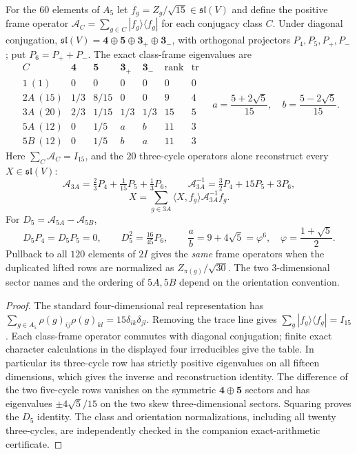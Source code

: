 \documentclass[11pt]{article}
\begin{document}
\begin{theorem}
\label{p1:thm:v342-class-frame-three-cycle-tomography}
For the $60$ elements of $A_5$ let
$f_g=Z_g/\sqrt{15}\in\mathfrak{sl}(V)$ and define the positive
frame operator $\mathcal A_C=\sum_{g\in C}|f_g\rangle\langle f_g|$
for each conjugacy class $C$.  Under diagonal conjugation,
$\mathfrak{sl}(V)=\mathbf4\oplus\mathbf5\oplus\mathbf3_+\oplus
\mathbf3_-$, with orthogonal projectors $P_4,P_5,P_+,P_-$;
put $P_6=P_++P_-$.  The exact class-frame eigenvalues are
\[
\begin{array}{c|cccc|cc}
 C & \mathbf4 & \mathbf5 & \mathbf3_+ & \mathbf3_- &
 \operatorname{rank} & \operatorname{tr}\\ \hline
 1\ (1)&0&0&0&0&0&0\\
 2A\ (15)&1/3&8/15&0&0&9&4\\
 3A\ (20)&2/3&1/15&1/3&1/3&15&5\\
 5A\ (12)&0&1/5&a&b&11&3\\
 5B\ (12)&0&1/5&b&a&11&3
\end{array}
\quad a=\frac{5+2\sqrt5}{15},\quad b=\frac{5-2\sqrt5}{15}.
\]
Here $\sum_C\mathcal A_C=I_{15}$, and the $20$ three-cycle
operators alone reconstruct every $X\in\mathfrak{sl}(V)$:
\[
 \mathcal A_{3A}=\tfrac23P_4+\tfrac1{15}P_5+\tfrac13P_6,
 \qquad \mathcal A_{3A}^{-1}=\tfrac32P_4+15P_5+3P_6,
\]
\[
 \boxed{X=\sum_{g\in3A}\langle X,f_g\rangle
              \mathcal A_{3A}^{-1}f_g.}
\]
For $D_5=\mathcal A_{5A}-\mathcal A_{5B}$,
\[
 D_5P_4=D_5P_5=0,\qquad
 D_5^2=\tfrac{16}{45}P_6,\qquad
 \frac ab=9+4\sqrt5=\varphi^6,
 \quad\varphi=\frac{1+\sqrt5}{2}.
\]
Pullback to all $120$ elements of $2I$ gives the \emph{same}
frame operators when the duplicated lifted rows are normalized
as $Z_{\pi(g)}/\sqrt{30}$.  The two $3$-dimensional sector names
and the ordering of $5A,5B$ depend on the orientation convention.
\end{theorem}
\begin{proof}
The standard four-dimensional real representation has
$\sum_{g\in A_5}\rho(g)_{ij}\rho(g)_{kl}=15\delta_{ik}\delta_{jl}$.
Removing the trace line gives $\sum_g|f_g\rangle\langle f_g|=I_{15}$.
Each class-frame operator commutes with diagonal conjugation;
finite exact character calculations in the displayed four
irreducibles give the table.  In particular its three-cycle row
has strictly positive eigenvalues on all fifteen dimensions,
which gives the inverse and reconstruction identity.
The difference of the two five-cycle rows vanishes on the
symmetric $\mathbf4\oplus\mathbf5$ sectors and has eigenvalues
$\pm4\sqrt5/15$ on the two skew three-dimensional sectors.
Squaring proves the $D_5$ identity.  The class and orientation
normalizations, including all twenty three-cycles, are independently
checked in the companion exact-arithmetic certificate.
\end{proof}
\end{document}
